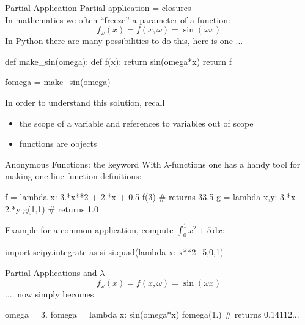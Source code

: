 \documentclass[hyperref={pdfpagelabels=false},table]{beamer}
\begin{document}
\begin{frame}[fragile]{Partial Application}
{\footnotesize Partial application = closures}\ \\
\vfill
In mathematics we often ``freeze'' a parameter of a function:
\[
 f_{\omega}(x)=f(x,\omega)=\sin(\omega x)
\]
\vfill
In Python there are many possibilities to do this, here is one ...
\begin{python}
def make_sin(omega):
    def f(x):
        return sin(omega*x)
    return f

fomega = make_sin(omega)

\end{python}
In order to understand this solution, recall
\begin{itemize}
\item the scope of a variable and references to variables out of scope
\item functions are objects
\end{itemize}
\end{frame}
\begin{frame}[fragile]{Anonymous Functions: the  keyword}
With $\lambda$-functions one has a handy tool for
making one-line function definitions:
\begin{python}
f = lambda x: 3.*x**2 + 2.*x + 0.5
f(3)  # returns 33.5
g = lambda x,y: 3.*x-2.*y
g(1,1) # returns 1.0
\end{python}
\vfill
Example for a common application, compute $\int_0^1 x^2 + 5 \, \mathrm{d} x$:\\
\vfill
\begin{python}
import scipy.integrate as si
si.quad(lambda x: x**2+5,0,1)
\end{python}
\end{frame}
\begin{frame}[fragile]{Partial Applications and $\lambda$}
\[
 f_{\omega}(x)=f(x,\omega)=\sin(\omega x)
\]
\vfill
 .... now simply becomes\\
\vfill
\begin{python}
omega = 3.
fomega = lambda x: sin(omega*x)
fomega(1.) # returns 0.14112...
\end{python}

\end{frame}
\end{document}
